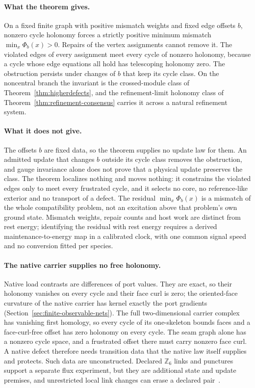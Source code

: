 \documentclass[11pt]{article}
\theoremstyle{remark}
\theoremstyle{plain}
\begin{document}
\paragraph{What the theorem gives.}
On a fixed finite graph with positive mismatch weights and fixed edge
offsets \(b\), nonzero cycle holonomy forces a strictly positive minimum
mismatch \(\min_x\Phi_b(x)>0\). Repairs of the vertex assignments cannot
remove it. The violated edges of every assignment meet every cycle of
nonzero holonomy, because a cycle whose edge equations all hold has
telescoping holonomy zero. The obstruction persists under changes of \(b\) that keep
its cycle class. On the noncentral branch the invariant is the
crossed-module class of Theorem~\ref{thm:higherdefects}, and the
refinement-limit holonomy class of Theorem~\ref{thm:refinement-consensus}
carries it across a natural refinement system.

\paragraph{What it does not give.}
The offsets \(b\) are fixed data, so the theorem supplies no update law for
them. An admitted update that changes \(b\) outside its cycle class removes
the obstruction, and gauge invariance alone does not prove that a physical
update preserves the class. The theorem localizes nothing and moves
nothing: it constrains the violated edges only to meet every frustrated
cycle, and it selects no core, no reference-like exterior and no transport
of a defect. The residual \(\min_x\Phi_b(x)\) is a mismatch of the whole
compatibility problem, not an excitation above that problem's own ground
state. Mismatch weights, repair counts and host work are distinct from
rest energy; identifying the residual with rest energy requires a derived
maintenance-to-energy map in a calibrated clock, with one common signal
speed and no conversion fitted per species.

\paragraph{The native carrier supplies no free holonomy.}
Native load contrasts are differences of port values. They are exact, so
their holonomy vanishes on every cycle and their face curl is zero; the
oriented-face curvature of the native carrier has kernel exactly the port
gradients (Section~\ref{sec:finite-observable-nets}). The full
two-dimensional carrier complex has vanishing first homology, so every
cycle of its one-skeleton bounds faces and a face-curl-free offset has zero
holonomy on every cycle. The seam graph alone has a nonzero cycle space,
and a frustrated offset there must carry nonzero face curl. A native defect
therefore needs transition data that the native law itself supplies and
protects. Such data are unconstructed. Declared \(\mathbb Z_6\) links and
punctures support a separate flux experiment, but they are additional state
and update premises, and unrestricted local link changes can erase a
declared pair~\cite{ophmodelguide}.
\end{document}
